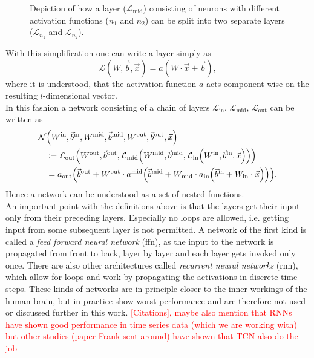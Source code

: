 \begin{figure}
\centering

\caption[Splitting different actvation functions into seperate layers]{Depiction of how a layer ($\mathcal{L}_\text{mid}$) consisting of neurons with different activation functions ($n_1$ and $n_2$) can be split into two separate layers ($\mathcal{L}_{n_1}$ and $\mathcal{L}_{n_2}$).}\label{fig:diff_activation_functions_layer}
\end{figure}

\noindent With this simplification one can write a layer simply as
\begin{equation}
\mathcal{L}(W,\vec{b},\vec{x})=a(W\cdot\vec{x}+\vec{b}),
\end{equation}
where it is understood, that the activation function $a$ acts component wise on the resulting $l$-dimensional vector.\\
In this fashion a network consisting of a chain of layers $\mathcal{L}_\text{in}$, $\mathcal{L}_\text{mid}$, $\mathcal{L}_\text{out}$ can be written as
\begin{align}
\mathcal{N} & \lr{W^\text{in}, \vec{b}^\text{in}, W^\text{mid}, \vec{b}^\text{mid}, W^\text{out}, \vec{b}^\text{out}, \vec{x}}\nonumber\\
\phantom{\mathcal{N}} & \coloneqq\mathcal{L}_\text{out}\lr{W^\text{out}, \vec{b}^\text{out}, \mathcal{L}_\text{mid}\lr{W^\text{mid}, \vec{b}^\text{mid}, \mathcal{L}_\text{in}\lr{W^\text{in}, \vec{b}^\text{in}, \vec{x}}}}\nonumber\\
\phantom{\mathcal{N}} & = a_\text{out}\lr{\vec{b}^\text{out}+W^\text{out}\cdot a^\text{mid}\lr{\vec{b}^\text{mid}+W_\text{mid}\cdot a_\text{in}\lr{\vec{b}^\text{in}+W_\text{in}\cdot \vec{x}}}}.
\end{align}
Hence a network can be understood as a set of nested functions.\\
An important point with the definitions above is that the layers get their input only from their preceding layers. Especially no loops are allowed, i.e. getting input from some subsequent layer is not permitted. A network of the first kind is called a \emph{feed forward neural network} (\gls{ffn}), as the input to the network is propagated from front to back, layer by layer and each layer gets invoked only once. There are also other architectures called \emph{recurrent neural networks} (\gls{rnn}), which allow for loops and work by propagating the activations in discrete time steps. These kinds of networks are in principle closer to the inner workings of the human brain, but in practice show worst performance and are therefore not used or discussed further in this work. \textcolor{red}{[Citations], maybe also mention that RNNs have shown good performance in time series data (which we are working with) but other studies (paper Frank sent around) have shown that TCN also do the job}\\
